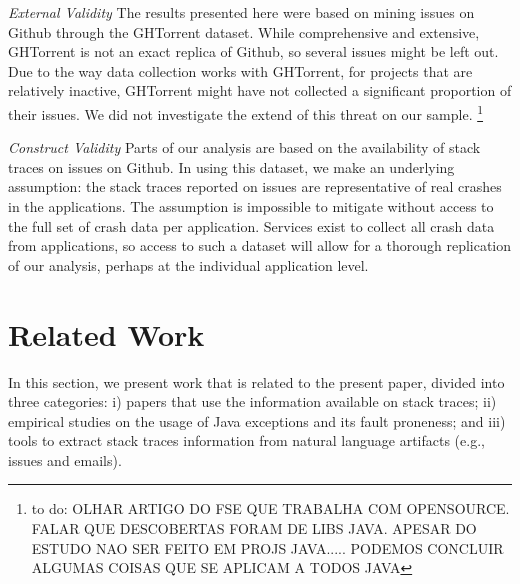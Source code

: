 \documentclass[conference]{IEEEtran}
\begin{document}
\noindent\emph{External Validity} The results presented here were based on mining
issues on Github through the GHTorrent dataset. While comprehensive and
extensive, GHTorrent is not an exact replica of Github, so several issues might
be left out. Due to the way data collection works with GHTorrent, for projects
that are relatively inactive, GHTorrent might have not collected a significant
proportion of their issues. We did not investigate the extend of this threat on
our sample.
\footnote{to do: OLHAR ARTIGO DO FSE QUE TRABALHA COM OPENSOURCE.
FALAR QUE DESCOBERTAS FORAM DE LIBS JAVA. APESAR DO ESTUDO NAO SER FEITO EM PROJS JAVA.....
PODEMOS CONCLUIR ALGUMAS COISAS QUE SE APLICAM A TODOS JAVA}

\noindent\emph{Construct Validity} Parts of our analysis are based on the availability of stack traces on issues on
Github. In using this dataset, we make an underlying assumption: the
stack traces reported on issues are representative of real crashes in
the applications. The assumption is impossible to mitigate without access to
the full set of crash data per application. Services exist to collect all
crash data from applications, so access to such a dataset will allow for
a thorough replication of our analysis, perhaps at the individual application
level.

\section{Related Work}
\label{sec:rele}

In this section, we present work that is related to the present paper, divided into
three categories: i) papers that use the information available on stack traces;
ii) empirical studies on the usage of Java exceptions and its fault proneness;
and iii) tools to extract stack traces information from natural language artifacts
(e.g., issues and emails).
\end{document}
